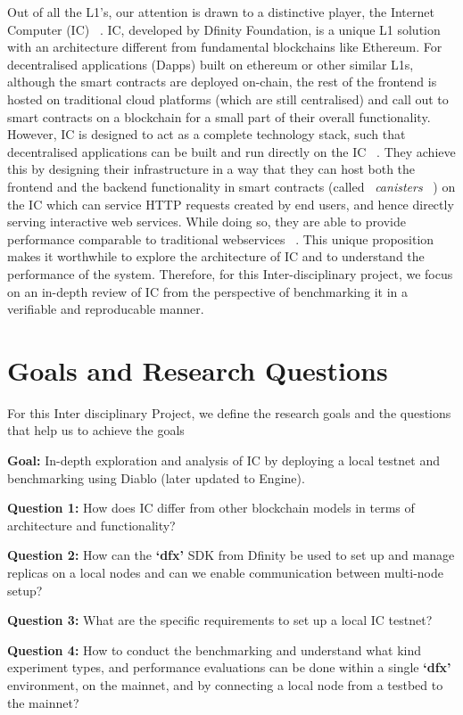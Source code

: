 Out of all the L1’s, our attention is drawn to a distinctive player, the Internet Computer (IC) ~\cite{InternetComputerRSS}. IC, developed by Dfinity Foundation, is a unique L1 solution with an architecture different from fundamental blockchains like Ethereum. For decentralised applications (Dapps) built on ethereum or other similar L1s, although the smart contracts are deployed on-chain, the rest of the frontend is hosted on traditional cloud platforms (which are still centralised) and call out to smart contracts on a blockchain for a small part of their overall functionality. However, IC is designed to act as a complete technology stack, such that decentralised applications can be built and run directly on the IC ~\cite{DfinityWhitepaper}. They achieve this by designing their infrastructure in a way that they can host both the frontend and the backend functionality in smart contracts (called ~\emph{canisters} ~\cite{dfinityCanisters}) on the IC which can service HTTP requests created by end users, and hence directly serving interactive web services. While doing so, they are able to provide performance comparable to traditional webservices ~\cite{webspeed}. This unique proposition makes it worthwhile to explore the architecture of IC and to understand the performance of the system. Therefore, for this Inter-disciplinary project, we focus on an in-depth review of IC from the perspective of benchmarking it in a verifiable and reproducable manner.

\section{Goals and Research Questions}

For this Inter disciplinary Project, we define the research goals and the questions that help us to achieve the goals

\textbf{Goal:}  In-depth exploration and analysis of IC by deploying a local testnet and benchmarking using Diablo (later updated to Engine).

\textbf{Question 1:} How does IC differ from other blockchain models in terms of architecture and functionality?

\textbf{Question 2:} How can the \textbf{`dfx'} SDK from Dfinity be used to set up and manage replicas on a local nodes and can we 
enable communication between multi-node setup?

\textbf{Question 3:} What are the specific requirements to set up a local IC testnet?

\textbf{Question 4:} How to conduct the benchmarking and understand what kind experiment types, and performance evaluations can be done within a single \textbf{`dfx'} environment, on the mainnet, and by connecting a local node from a testbed to the mainnet?



